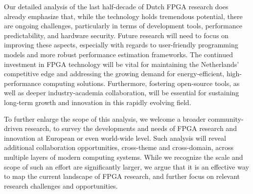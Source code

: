 Our detailed analysis of the last half-decade of Dutch FPGA research does already emphasize that, while the technology holds tremendous potential, there are ongoing challenges, particularly in terms of development tools, performance predictability, and hardware security. Future research will need to focus on improving these aspects, especially with regards to user-friendly programming models and more robust performance estimation frameworks. The continued investment in FPGA technology will be vital for maintaining the Netherlands' competitive edge and addressing the growing demand for energy-efficient, high-performance computing solutions. Furthermore, fostering open-source tools, as well as deeper industry-academia collaboration, will be essential for sustaining long-term growth and innovation in this rapidly evolving field.

To further enlarge the scope of this analysis, we welcome a broader community-driven research, to survey the developments and needs of FPGA research and innovation at European or even world-wide level. Such analysis will reveal additional collaboration opportunities, cross-theme and cross-domain, across multiple layers of modern computing systems. While we recognize the scale and scope of such an effort are significantly larger, we argue that it is an effective way to map the current landscape of FPGA research, and further focus on relevant research challenges and opportunities.  
